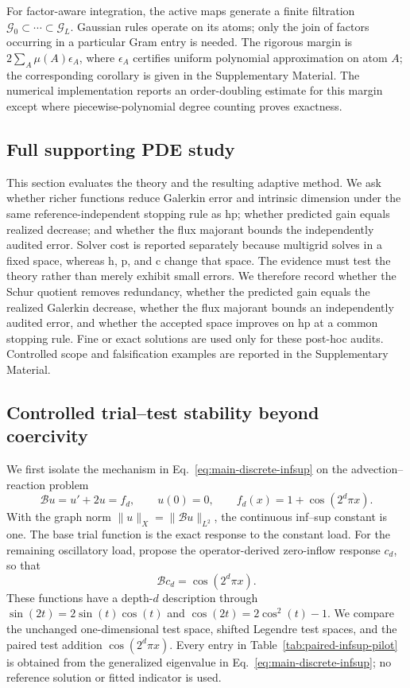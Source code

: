 \documentclass[11pt]{article}
\numberwithin{algorithm}{section}
\theoremstyle{definition}\newtheorem{definition}[theorem]{Definition}
\theoremstyle{remark}\newtheorem{remark}[theorem]{Remark}
\begin{document}
For factor-aware integration, the active maps generate a finite filtration
$\mathcal G_0\subset\cdots\subset\mathcal G_L$.  Gaussian rules operate on its
atoms; only the join of factors occurring in a particular Gram entry is
needed.  The rigorous margin is
$2\sum_A\mu(A)\epsilon_A$, where $\epsilon_A$ certifies uniform polynomial
approximation on atom $A$; the corresponding corollary is given in the
Supplementary Material.  The numerical implementation reports an
order-doubling estimate for this margin except where piecewise-polynomial degree
counting proves exactness.

\secondarynumericsD
\subsection{Full supporting PDE study}
This section evaluates the theory and the resulting adaptive method.  We ask whether richer functions reduce
Galerkin error and intrinsic dimension under the same reference-independent
stopping rule as hp; whether predicted gain equals realized decrease; and
whether the flux majorant bounds the independently audited error.  Solver
cost is reported separately because multigrid solves in a fixed space, whereas
h, p, and c change that space.
The evidence must test the theory rather than merely exhibit small errors.  We
therefore record whether the Schur quotient removes redundancy, whether the
predicted gain equals the realized Galerkin decrease, whether the flux
majorant bounds an independently audited error, and whether the accepted space
improves on hp at a common stopping rule.  Fine or exact solutions are used
only for these post-hoc audits.  Controlled scope and falsification examples
are reported in the Supplementary Material.

\subsection{Controlled trial--test stability beyond coercivity}
We first isolate the mechanism in Eq.~\eqref{eq:main-discrete-infsup} on the
advection--reaction problem
\[
 \mathcal Bu=u'+2u=f_d,\qquad u(0)=0,\qquad
 f_d(x)=1+\cos(2^d\pi x).
\]
With the graph norm $\|u\|_X=\|\mathcal Bu\|_{L^2}$, the continuous inf--sup
constant is one. The base trial function is the exact response to the constant
load. For the remaining oscillatory load, propose the operator-derived
zero-inflow response $c_d$, so that
\[
 \mathcal Bc_d=\cos(2^d\pi x).
\]
These functions have a depth-$d$ description through
$\sin(2t)=2\sin(t)\cos(t)$ and $\cos(2t)=2\cos^2(t)-1$. We compare the
unchanged one-dimensional test space, shifted Legendre test spaces, and the
paired test addition $\cos(2^d\pi x)$. Every entry in
Table~\ref{tab:paired-infsup-pilot} is obtained from the generalized
eigenvalue in Eq.~\eqref{eq:main-discrete-infsup}; no reference solution or
fitted indicator is used.
\end{document}
